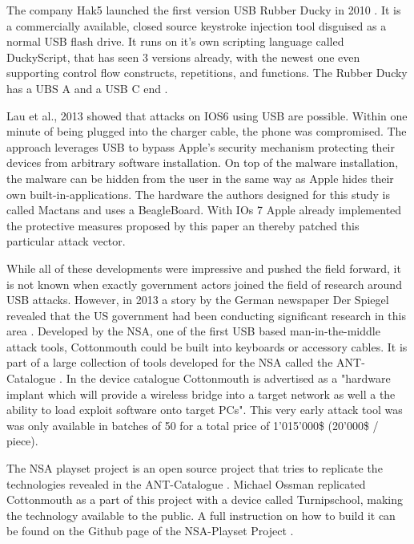 The company Hak5 launched the first version USB Rubber Ducky in 2010 \cite{USBRubberDucky}. It is a commercially available, closed source keystroke injection tool disguised as a normal USB flash drive. It runs on it's own scripting language called DuckyScript, that has seen 3 versions already, with the newest one even supporting control flow constructs, repetitions, and functions. The Rubber Ducky has a UBS A and a USB C end \cite{USBRubberDucky2023}.  

Lau et al., 2013 \cite{lauMactansInjectingMalware2013} showed that attacks on IOS6 using USB are possible. Within one minute of being plugged into the charger cable, the phone was compromised. The approach leverages USB to bypass Apple's security mechanism protecting their devices from arbitrary software installation. On top of the malware installation, the malware can be hidden from the user in the same way as Apple hides their own built-in-applications. 
The hardware the authors designed for this study is called Mactans and uses a BeagleBoard. With IOs 7 Apple already implemented the protective measures proposed by this paper an thereby patched this particular attack vector. 

While all of these developments were impressive and pushed the field forward, it is not known when exactly government actors joined the field of research around USB attacks. However, in 2013 a story by the German newspaper Der Spiegel revealed that the US government had been conducting significant research in this area \cite{appelbaumCatalogRevealsNSA2013}. Developed by the NSA, one of the first USB based man-in-the-middle attack tools, Cottonmouth could be built into keyboards or accessory cables. It is part of a large collection of tools developed for the NSA called the ANT-Catalogue \cite{InteractiveGraphicNSA}. In the device catalogue Cottonmouth is advertised as a "hardware implant which will provide a wireless bridge into a target network as well a the ability to load exploit software onto target PCs". This very early attack tool was was only available in batches of 50 for a total price of 1'015'000\$ (20'000\$ / piece).

The NSA playset project is an open source project that tries to replicate the technologies revealed in the ANT-Catalogue \cite{NSAPlaysetTurnipschoolHtml}. Michael Ossman replicated Cottonmouth as a part of this  project with a device called Turnipschool, making the technology available to the public. A full instruction on how to build it can be found on the Github page of the NSA-Playset Project \cite{NSAPlaysetTurnipschoolHtml}. 

